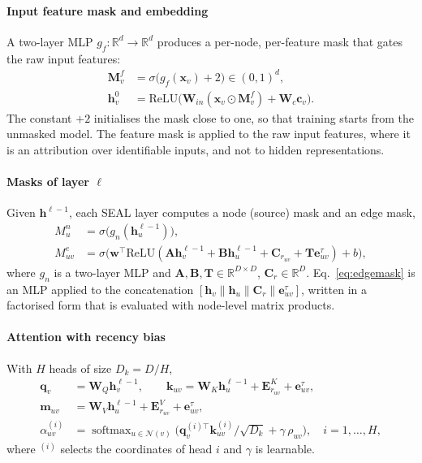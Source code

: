 \paragraph{Input feature mask and embedding} A two-layer MLP $g_f:\mathbb{R}^{d}\to\mathbb{R}^{d}$ produces a per-node, per-feature mask that gates the raw input features:
\begin{align}
\mathbf{M}^{f}_v&=\sigma\big(g_f(\mathbf{x}_v)+2\big)\in(0,1)^{d},\label{eq:featmask}\\
\mathbf{h}^{0}_v&=\mathrm{ReLU}\big(\mathbf{W}_{in}(\mathbf{x}_v\odot\mathbf{M}^{f}_v)+\mathbf{W}_{c}\mathbf{c}_v\big).\label{eq:h0}
\end{align}
The constant $+2$ initialises the mask close to one, so that training starts from the unmasked model. The feature mask is applied to the raw input features, where it is an attribution over identifiable inputs, and not to hidden representations.

\paragraph{Masks of layer $\ell$} Given $\mathbf{h}^{\ell-1}$, each SEAL layer computes a node (source) mask and an edge mask,
\begin{align}
M^{n}_u&=\sigma\big(g_n(\mathbf{h}^{\ell-1}_u)\big),\label{eq:nodemask}\\
M^{e}_{uv}&=\sigma\big(\mathbf{w}^{\top}\mathrm{ReLU}(\mathbf{A}\mathbf{h}^{\ell-1}_v+\mathbf{B}\mathbf{h}^{\ell-1}_u+\mathbf{C}_{r_{uv}}+\mathbf{T}\mathbf{e}^{\tau}_{uv})+b\big),\label{eq:edgemask}
\end{align}
where $g_n$ is a two-layer MLP and $\mathbf{A},\mathbf{B},\mathbf{T}\in\mathbb{R}^{D\times D}$, $\mathbf{C}_r\in\mathbb{R}^{D}$. Eq.~\eqref{eq:edgemask} is an MLP applied to the concatenation $[\mathbf{h}_v\|\mathbf{h}_u\|\mathbf{C}_{r}\|\mathbf{e}^{\tau}_{uv}]$, written in a factorised form that is evaluated with node-level matrix products.

\paragraph{Attention with recency bias} With $H$ heads of size $D_k=D/H$,
\begin{align}
\mathbf{q}_v&=\mathbf{W}_Q\mathbf{h}^{\ell-1}_v,\qquad
\mathbf{k}_{uv}=\mathbf{W}_K\mathbf{h}^{\ell-1}_u+\mathbf{E}^{K}_{r_{uv}}+\mathbf{e}^{\tau}_{uv},\nonumber\\
\mathbf{m}_{uv}&=\mathbf{W}_V\mathbf{h}^{\ell-1}_u+\mathbf{E}^{V}_{r_{uv}}+\mathbf{e}^{\tau}_{uv},\nonumber\\
\alpha^{(i)}_{uv}&=\operatorname{softmax}_{u\in\mathcal{N}(v)}\Big(\mathbf{q}^{(i)\top}_v\mathbf{k}^{(i)}_{uv}/\sqrt{D_k}+\gamma\,\rho_{uv}\Big),\quad i=1,\dots,H,\label{eq:att}
\end{align}
where $^{(i)}$ selects the coordinates of head $i$ and $\gamma$ is learnable.

